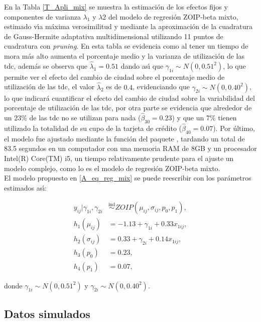 En la Tabla \ref{T_Apli_mix} se muestra la estimaci\'{o}n de los efectos fijos y componentes de varianza $\lambda_1$ y $\lambda2$ del modelo de regresi\'{o}n ZOIP-beta mixto, estimado v\'{\i}a m\'{a}xima verosimilitud y mediante la aproximaci\'{o}n de la cuadratura de Gauss-Hermite adaptativa multidimensional utilizando 11 puntos de cuadratura con \textit{pruning}. En esta tabla se evidencia como al tener un tiempo de mora m\'{a}s alto aumenta el porcentaje medio y la varianza de utilizaci\'{o}n de las tdc, adem\'{a}s se observa que $\hat{\lambda}_1=0.51$ dando as\'{\i} que $\gamma_{1i} \sim N(0, 0.51^2)$, lo que permite ver el efecto del cambio de ciudad sobre el porcentaje medio de utilizaci\'{o}n de las tdc, el valor $\hat{\lambda}_2$ es de $0.4$, evidenciando que $\gamma_{2i} \sim N(0, 0.40^2)$, lo que indicar\'{a} cuantificar el efecto del cambio de ciudad sobre la variabilidad del porcentaje de utilizaci\'{o}n de las tdc, por otra parte se evidencia que alrededor de un 23\% de las tdc no se utilizan para nada ($\hat{\beta}_{30}=0.23$) y que un 7\% tienen utilizado la totalidad de su cupo de la tarjeta de cr\'{e}dito ($\hat{\beta}_{40}=0.07$). Por \'{u}ltimo, el modelo fue ajustado mediante la funci\'{o}n  del paquete , tardando un total de 83.5 segundos en un computador con una memoria RAM de 8GB y un procesador Intel(R) Core(TM) i5, un tiempo relativamente prudente para el ajuste un modelo complejo, como lo es el modelo de regresi\'{o}n ZOIP-beta mixto.\\

El modelo propuesto en \eqref{A_eq_reg_mix} se puede reescribir con los par\'{a}metros estimados as\'{\i}:

\begin{equation}
\begin{split}
y_{ij}| \gamma_{1i},\gamma_{2i} & \overset{\text{ind}}{\sim} ZOIP(\mu_{ij},\sigma_{ij},p_0, p_1),\\
h_1(\mu_{ij})&=-1.13+\gamma_{1i}+0.33 x_{1ij},\\
h_2(\sigma_{ij})&=0.33+\gamma_{2i}+0.14 x_{1ij},\\
h_3(p_{0})&=0.23,\\
h_4(p_{1})&=0.07,
\end{split}
\label{A_eq_reg_mix2}
\end{equation}

donde $\gamma_{1i} \sim N(0, 0.51^2)$ y $\gamma_{2i} \sim N(0, 0.40^2)$.

\subsection{Datos simulados}

